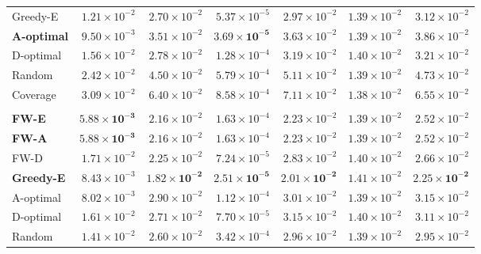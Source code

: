 \documentclass[letterpaper, 9
 pt, conference]{ieeeconf}
\begin{document}
\begin{table}[ht]
\begin{tabular}{lrrrrrr}
Greedy-E & $1.21\!\times\!10^{-2}$ & $2.70\!\times\!10^{-2}$ & $5.37\!\times\!10^{-5}$ & $2.97\!\times\!10^{-2}$ & $1.39\!\times\!10^{-2}$ & $3.12\!\times\!10^{-2}$ \\
\textbf{A-optimal} & $9.50\!\times\!10^{-3}$ & $3.51\!\times\!10^{-2}$ & $\mathbf{3.69\!\times\!10^{-5}}$ & $3.63\!\times\!10^{-2}$ & $1.39\!\times\!10^{-2}$ & $3.86\!\times\!10^{-2}$ \\
D-optimal & $1.56\!\times\!10^{-2}$ & $2.78\!\times\!10^{-2}$ & $1.28\!\times\!10^{-4}$ & $3.19\!\times\!10^{-2}$ & $1.40\!\times\!10^{-2}$ & $3.21\!\times\!10^{-2}$ \\
Random & $2.42\!\times\!10^{-2}$ & $4.50\!\times\!10^{-2}$ & $5.79\!\times\!10^{-4}$ & $5.11\!\times\!10^{-2}$ & $1.39\!\times\!10^{-2}$ & $4.73\!\times\!10^{-2}$ \\
Coverage & $3.09\!\times\!10^{-2}$ & $6.40\!\times\!10^{-2}$ & $8.58\!\times\!10^{-4}$ & $7.11\!\times\!10^{-2}$ & $1.38\!\times\!10^{-2}$ & $6.55\!\times\!10^{-2}$ \\
\addlinespace[1pt]
\multicolumn{7}{l}{\textit{$K{=}20$}} \\[1pt]
\textbf{FW-E} & $\mathbf{5.88\!\times\!10^{-3}}$ & $2.16\!\times\!10^{-2}$ & $1.63\!\times\!10^{-4}$ & $2.23\!\times\!10^{-2}$ & $1.39\!\times\!10^{-2}$ & $2.52\!\times\!10^{-2}$ \\
\textbf{FW-A} & $\mathbf{5.88\!\times\!10^{-3}}$ & $2.16\!\times\!10^{-2}$ & $1.63\!\times\!10^{-4}$ & $2.23\!\times\!10^{-2}$ & $1.39\!\times\!10^{-2}$ & $2.52\!\times\!10^{-2}$ \\
FW-D & $1.71\!\times\!10^{-2}$ & $2.25\!\times\!10^{-2}$ & $7.24\!\times\!10^{-5}$ & $2.83\!\times\!10^{-2}$ & $1.40\!\times\!10^{-2}$ & $2.66\!\times\!10^{-2}$ \\
\textbf{Greedy-E} & $8.43\!\times\!10^{-3}$ & $\mathbf{1.82\!\times\!10^{-2}}$ & $\mathbf{2.51\!\times\!10^{-5}}$ & $\mathbf{2.01\!\times\!10^{-2}}$ & $1.41\!\times\!10^{-2}$ & $\mathbf{2.25\!\times\!10^{-2}}$ \\
A-optimal & $8.02\!\times\!10^{-3}$ & $2.90\!\times\!10^{-2}$ & $1.12\!\times\!10^{-4}$ & $3.01\!\times\!10^{-2}$ & $1.39\!\times\!10^{-2}$ & $3.15\!\times\!10^{-2}$ \\
D-optimal & $1.61\!\times\!10^{-2}$ & $2.71\!\times\!10^{-2}$ & $7.70\!\times\!10^{-5}$ & $3.15\!\times\!10^{-2}$ & $1.40\!\times\!10^{-2}$ & $3.11\!\times\!10^{-2}$ \\
Random & $1.41\!\times\!10^{-2}$ & $2.60\!\times\!10^{-2}$ & $3.42\!\times\!10^{-4}$ & $2.96\!\times\!10^{-2}$ & $1.39\!\times\!10^{-2}$ & $2.95\!\times\!10^{-2}$ \\

\end{tabular}
\end{table}
\end{document}
